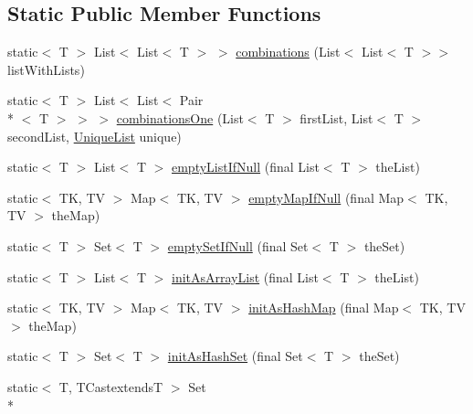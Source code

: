 \subsection*{Static Public Member Functions}
\begin{DoxyCompactItemize}
\item 
static$<$ T $>$ List$<$ List$<$ T $>$ $>$ \hyperlink{classorg_1_1tzi_1_1use_1_1util_1_1collections_1_1_collection_util_ad039749af902c3423891994e6c49b466}{combinations} (List$<$ List$<$ T $>$$>$ list\-With\-Lists)
\item 
static$<$ T $>$ List$<$ List$<$ Pair\\*
$<$ T $>$ $>$ $>$ \hyperlink{classorg_1_1tzi_1_1use_1_1util_1_1collections_1_1_collection_util_ad6a2f4cbb36b9e7a558f310274ae0db1}{combinations\-One} (List$<$ T $>$ first\-List, List$<$ T $>$ second\-List, \hyperlink{enumorg_1_1tzi_1_1use_1_1util_1_1collections_1_1_collection_util_1_1_unique_list}{Unique\-List} unique)
\item 
static$<$ T $>$ List$<$ T $>$ \hyperlink{classorg_1_1tzi_1_1use_1_1util_1_1collections_1_1_collection_util_a19540d61ddd64e48680aaceae6a04a97}{empty\-List\-If\-Null} (final List$<$ T $>$ the\-List)
\item 
static$<$ T\-K, T\-V $>$ Map$<$ T\-K, T\-V $>$ \hyperlink{classorg_1_1tzi_1_1use_1_1util_1_1collections_1_1_collection_util_aa77c5c39d58ca6b05eee3896331a3b25}{empty\-Map\-If\-Null} (final Map$<$ T\-K, T\-V $>$ the\-Map)
\item 
static$<$ T $>$ Set$<$ T $>$ \hyperlink{classorg_1_1tzi_1_1use_1_1util_1_1collections_1_1_collection_util_a3dda7c84f5067368780e7928a6227217}{empty\-Set\-If\-Null} (final Set$<$ T $>$ the\-Set)
\item 
static$<$ T $>$ List$<$ T $>$ \hyperlink{classorg_1_1tzi_1_1use_1_1util_1_1collections_1_1_collection_util_a1897c420788e85e3f4383d86fe40c87e}{init\-As\-Array\-List} (final List$<$ T $>$ the\-List)
\item 
static$<$ T\-K, T\-V $>$ Map$<$ T\-K, T\-V $>$ \hyperlink{classorg_1_1tzi_1_1use_1_1util_1_1collections_1_1_collection_util_a406baf00e97c7ef82e3014ec41c90de3}{init\-As\-Hash\-Map} (final Map$<$ T\-K, T\-V $>$ the\-Map)
\item 
static$<$ T $>$ Set$<$ T $>$ \hyperlink{classorg_1_1tzi_1_1use_1_1util_1_1collections_1_1_collection_util_a25e27cfb1cda707b93a2b7a033483b11}{init\-As\-Hash\-Set} (final Set$<$ T $>$ the\-Set)
\item 
static$<$ T, T\-Castextends\-T $>$ Set\\*
$$
\end{DoxyCompactItemize}
